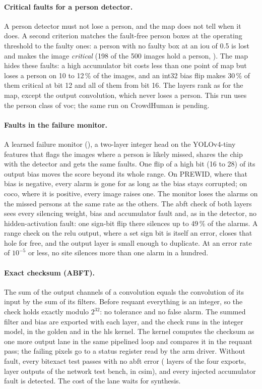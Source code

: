 \documentclass[11pt,a4paper]{article}
\begin{document}
\paragraph{Critical faults for a person detector.} A person detector must not lose a person,
and the \gls{map} does not tell when it does. A second criterion matches the fault-free person
boxes at the operating threshold to the faulty ones: a person with no faulty box at an
\gls{iou} of 0.5 is lost and makes the image \emph{critical} (198 of the 500 images hold a
person, ). The \gls{map} hides these faults: a high accumulator bit
costs less than one point of \gls{map} but loses a person on 10 to 12\,\% of the images, and
an int32 bias flip makes 30\,\% of them critical at bit 12 and all of them from bit 16. The
layers rank as for the \gls{map}, except the output convolution, which never loses a person.
This run uses the person class of \gls{voc}; the same run on CrowdHuman is pending.

\paragraph{Faults in the failure monitor.} A learned failure monitor (), a two-layer
integer head on the YOLOv4-tiny features that flags the images where a person is likely
missed, shares the chip with the detector and gets the same faults. One flip of a high bit
(16 to 28) of its output bias moves the score beyond its whole range. On PREWID, where that
bias is negative, every alarm is gone for as long as the bias stays corrupted; on \gls{coco},
where it is positive, every image raises one. The monitor loses the alarms on the missed
persons at the same rate as the others. The \gls{abft} check of both layers sees every
silencing weight, bias and accumulator fault and, as in the detector, no hidden-activation
fault: one sign-bit flip there silences up to 49\,\% of the alarms. A range check on the
\gls{relu} output, where a set sign bit is itself an error, closes that hole for free, and the
output layer is small enough to duplicate. At an error rate of $10^{-5}$ or less, no site
silences more than one alarm in a hundred.

\paragraph{Exact checksum (ABFT).} The sum of the output channels of a convolution equals the
convolution of its input by the sum of its filters. Before \gls{requant} everything is an
integer, so the check holds exactly modulo $2^{32}$: no tolerance and no false alarm. The
summed filter and bias are exported with each layer, and the check runs in the integer model,
in the \gls{golden} and in the \gls{hls} kernel. The kernel computes the checksum as one more
output lane in the same pipelined loop and compares it in the \gls{requant} pass; the
failing pixels go to a status register read by the \gls{arm} driver. Without fault, every
\gls{bitexact} test passes with no \gls{abft} error ( layers of the four
exports,  layer outputs of the network test bench, in \gls{csim}),
and every injected accumulator fault is detected. The cost of the lane waits for synthesis.
\end{document}
